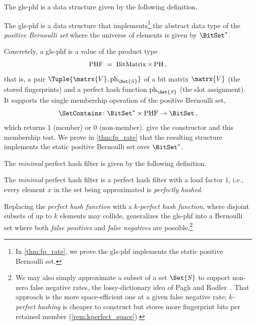 \documentclass[ ../main.tex]{subfiles}
\begin{document}
The \gls{gls-phf} is a data structure given by the following definition.
\begin{definition}
The \gls{gls-phf} is a data structure that implements\footnote{In \cref{thm:fp_rate}, we prove the \gls{gls-phf} implements the static positive Bernoulli set.} the abstract data type of the \emph{positive Bernoulli set} where the universe of elements is given by $\BitSet^*$.
\end{definition}


Concretely, a \gls{gls-phf} is a value of the product type
\begin{equation}
\label{eq:phf_type}
    \operatorname{PHF} \;=\; \operatorname{BitMatrix} \times \operatorname{PH}\,,
\end{equation}
that is, a pair $\Tuple{\matrx{V}, \ph_{\Set{S}}}$ of a bit matrix $\matrx{V}$ (the stored fingerprints) and a perfect hash function $\ph_{\Set{S}}$ (the slot assignment). It supports the single membership operation of the positive Bernoulli set,
\begin{equation}
\label{eq:phf_contains_type}
    \SetContains \colon \BitSet^* \times \PHF \to \BitSet\,,
\end{equation}
which returns $1$ (member) or $0$ (non-member).  give the constructor and this membership test. We prove in \cref{thm:fp_rate} that the resulting structure implements the static positive Bernoulli set over $\BitSet^*$.

The \emph{minimal} perfect hash filter is given by the following definition.
\begin{definition}
The \emph{minimal} perfect hash filter is a perfect hash filter with a load factor $1$, i.e., every element $x$ in the set being approximated is \emph{perfectly hashed}.
\end{definition}
Replacing the \emph{perfect hash function} with a \emph{$k$-perfect hash function}, where disjoint subsets of up to $k$ elements may collide, generalizes the \gls{gls-phf} into a Bernoulli set where both \emph{false positives} and \emph{false negatives} are possible.\footnote{We may also simply approximate a subset of a set $\Set{S}$ to support non-zero false negative rates, the lossy-dictionary idea of Pagh and Rodler~\cite{pagh2001lossy}. That approach is the more space-efficient one at a given false negative rate; \emph{$k$-perfect hashing} is cheaper to construct but stores more fingerprint bits per retained member (\cref{rem:kperfect_space}).}
\end{document}
